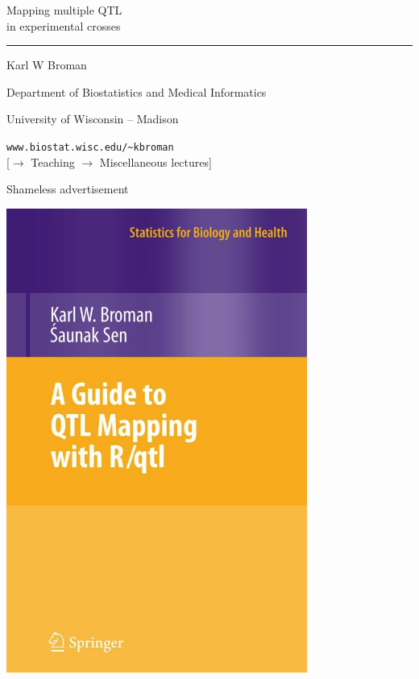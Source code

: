 \documentclass[12pt]{article}
\newcommand{\titlesize}{\fontsize{40}{50} \selectfont}
\newcommand{\headsize}{\fontsize{35}{35} \selectfont}
\newcommand{\textsize}{\fontsize{30}{35} \selectfont}
\newcommand{\smallsize}{\fontsize{25}{30} \selectfont}
\newcommand{\smallestsize}{\fontsize{18}{22} \selectfont}
\begin{document}
\thispagestyle{empty}

\begin{center}
\titlesize \color{myyellow}

\vspace*{15mm}

Mapping multiple QTL \\ in experimental crosses

\color{mypink}
\rule{10in}{1mm}

\vspace{5mm}

\textsize \color{myblue}
Karl W Broman
\vspace{5mm}

\color{mywhite}
{\smallsize Department of Biostatistics and Medical Informatics

University of Wisconsin -- Madison
\vspace{20mm}


\verb|www.biostat.wisc.edu/~kbroman| \\
{\smallestsize \color{myblue} 
[$\rightarrow$ Teaching $\rightarrow$ Miscellaneous lectures]}
}

\end{center}

\newpage

\headsize \color{myyellow}
\hfill \begin{minipage}{5.75in}
\centering
Shameless advertisement
\end{minipage}

\vspace{20mm}

\centerline{\includegraphics[height=6in]{Figs/book_cover_lg.jpg}}
\end{document}
